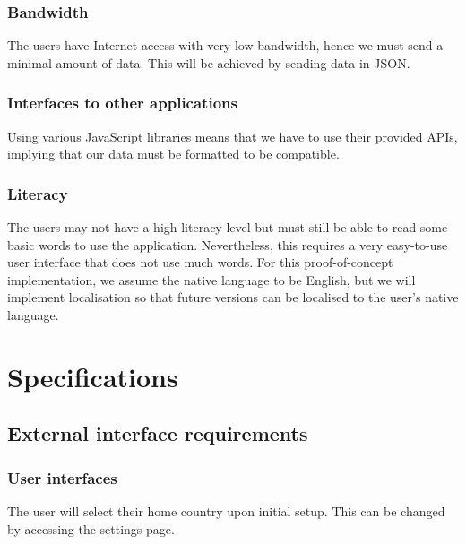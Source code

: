 \documentclass[12pt,a4paper,twoside]{article}
\begin{document}
\subsubsection{Bandwidth}
The users have Internet access with very low bandwidth, hence we must send a minimal amount of data. This will be achieved by sending data in JSON.

\subsubsection{Interfaces to other applications}
Using various JavaScript libraries means that we have to use their provided APIs, implying that our data must be formatted to be compatible.

\subsubsection{Literacy}
The users may not have a high literacy level but must still be able to read some basic words to use the application. Nevertheless, this requires a very easy-to-use user interface that does not use much words. For this proof-of-concept implementation, we assume the native language to be English, but we will implement localisation so that future versions can be localised to the user's native language.

\section{Specifications}

\subsection{External interface requirements}

\subsubsection{User interfaces}

The user will select their home country upon initial setup. This can be changed by accessing the settings page.
\end{document}
